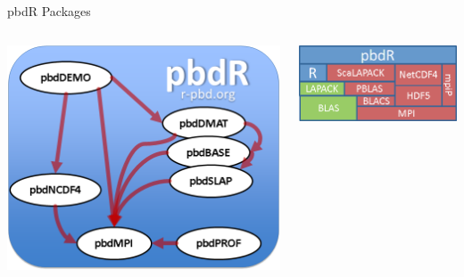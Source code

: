 \begin{frame}
  \begin{block}{pbdR Packages}
    \begin{center}
      \begin{columns}\hspace{.2cm}
        \begin{column}{.52\textwidth}
      \includegraphics[scale=.35]{../common/pics/pbdR}
        \end{column}
        \begin{column}{.43\textwidth}
      \includegraphics[scale=.45]{../common/pics/libs}
        \end{column}
      \end{columns}
    \end{center}
  \end{block}
\end{frame}


